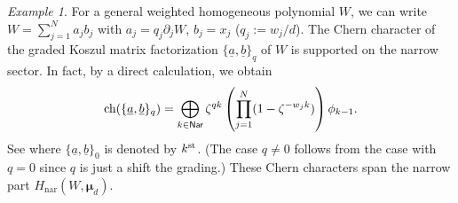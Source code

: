\documentclass[11pt]{amsart}
\theoremstyle{definition} %
\theoremstyle{remark} %
\newtheorem{exa}[thm]{Example}%
\newcommand{\nar}{\operatorname{nar}}
\newcommand{\ch}{{\rm ch}}
\newcommand{\bmu}{\boldsymbol{\mu}}
\newcommand{\Nar}{\operatorname{\mathsf{Nar}}}
\newcommand{\ua}{\underline{a}}
\newcommand{\ub}{\underline{b}}
\begin{document}
\begin{exa}
\label{exa:ch-Koszul} 
For a general weighted homogeneous polynomial $W$, 
we can write $W = \sum_{j=1}^N a_j b_j$ 
with $a_j = q_j \partial_j W$, $b_j = x_j$ ($q_j := w_j/d$). 
The Chern character of the graded Koszul matrix factorization 
$\{\ua,\ub\}_q$ of $W$ is supported on the narrow sector. 
In fact, by a direct calculation, %
we obtain  
\begin{equation}
\label{eq:chernbrane}
\ch(\{\ua, \ub\}_q ) = 
\bigoplus_{k\in \Nar} 
\zeta^{qk}\left( 
\prod_{j=1}^{N}(1-\zeta^{-w_j k})
\right)  \phi_{k-1}. 
\end{equation}
See \cite[Proposition 4.3.4]{PVmf} where 
$\{\ua,\ub\}_0$ is denoted by $k^{\rm st}$. 
(The case $q\neq 0$ follows from the case with $q=0$ since 
$q$ is just a shift the grading.) 
These Chern characters span the narrow part $H_{\nar}(W,\bmu_d)$. 
\end{exa} 
\end{document}

